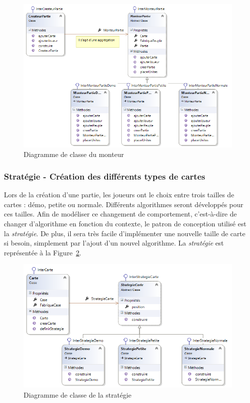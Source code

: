 \documentclass[a4paper]{article}%
\begin{document}
\begin{figure}[H]
    \centering
    \includegraphics[width=\textwidth]{./images/classe/monteur.png}
		\caption{Diagramme de classe du monteur}
		\label{fig:class_monteur}
\end{figure}


\subsubsection{Stratégie - Création des différents types de cartes}

Lors de la création d'une partie, les joueurs ont le choix entre trois tailles de cartes : démo, petite ou normale. Différents algorithmes seront développés pour ces tailles. Afin de modéliser ce changement de comportement, c'est-à-dire de changer d'algorithme en fonction du contexte, le patron de conception utilisé est la \textit{stratégie}. De plus, il sera très facile d'implémenter une nouvelle taille de carte si besoin, simplement par l'ajout d'un nouvel algorithme. La \textit{stratégie} est représentée à la Figure~\ref{fig:class_strategie}.

\begin{figure}[H]
    \centering
    \includegraphics[width=\textwidth]{./images/classe/strategie.png}
		\caption{Diagramme de classe de la stratégie}
		\label{fig:class_strategie}
\end{figure}
\end{document}
